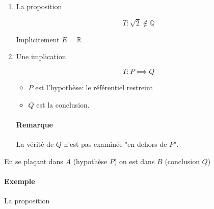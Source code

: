\documentclass[
    11pt,
    a4paper,
    oneside,
    headinlcude, footinclude,
    twoside,
]{report}
\begin{document}
\begin{enumerate}
    \item La proposition

        $$T : \sqrt{2} \notin \mathbb{Q}$$

        Implicitement $E = \mathbb{R}$

    \item Une implication 

        $$T : P \implies Q$$

        \begin{itemize}
            \item $P$ est l'hypothèse: le référentiel restreint
            \item $Q$ est la conclusion.
        \end{itemize}

        \paragraph{Remarque}
        \label{par:remarque}
        
        La vérité de $Q$ n'est pas examinée "en dehors de $P$".
\end{enumerate}



\begin{center}
    \begin{minipage}{.5\textwidth}
    \end{minipage}
    \begin{minipage}{.49\linewidth}
        En se plaçant dans $A$  (hypothèse $P$) on est dans $B$ (conclusion $Q$)
    \end{minipage}
\end{center}


\paragraph{Exemple}

La proposition 
\end{document}
